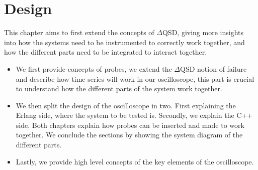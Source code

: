 \chapter{Design}
    This chapter aims to first extend the concepts of $\Delta$QSD, giving more insights into how the systems need to be instrumented to correctly work together, and how the different parts need to be integrated to interact together.
    \begin{itemize}
        \item We first provide concepts of probes, we extend the $\Delta$QSD notion of failure and describe how time series will work in our oscilloscope, this part is crucial to understand how the different parts of the system work together.
        \item We then split the design of the oscilloscope in two. First explaining the Erlang side, where the system to be tested is. Secondly, we explain the C++ side. Both chapters explain how probes can be inserted and made to work together. We conclude the sections by showing the system diagram of the different parts.
        \item Lastly, we provide high level concepts of the key elements of the oscilloscope. 
    \end{itemize}

    
    
    
      
    
    
    
    
